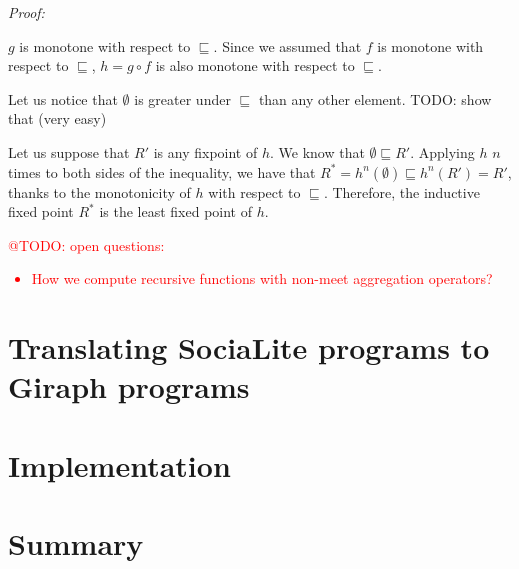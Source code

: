\documentclass{pracamgr}
\makeatletter
\theoremstyle{plain}
\theoremstyle{definition}
\theoremstyle{remark}
\newcommand{\todo}[1]{\textcolor{red}{@TODO: #1}}
\makeatother
\begin{document}
\emph{Proof:} 

$g$ is monotone with respect to $\sqsubseteq$. Since we assumed that $f$ is monotone with respect to $\sqsubseteq$, $h = g \circ f$ is also monotone with respect to $\sqsubseteq$. 

Let us notice that $\emptyset$ is greater under $\sqsubseteq$ than any other element.
TODO: show that (very easy)

Let us suppose that $R'$ is any fixpoint of $h$.  We know that $\emptyset \sqsubseteq R'$. Applying $h$ $n$ times to both sides of the inequality, we have that $R^* = h^n(\emptyset) \sqsubseteq h^n(R') = R'$, thanks to the monotonicity of $h$ with respect to $\sqsubseteq$. Therefore, the inductive fixed point $R^*$ is the least fixed point of $h$.

\todo{open questions:
\begin{itemize}
\item How we compute recursive functions with non-meet aggregation operators?
\end{itemize}
}
\chapter{Translating SociaLite programs to Giraph programs}\label{r:s2g}

\chapter{Implementation}\label{r:implementation}

\chapter{Summary}\label{r:summary}
\end{document}

